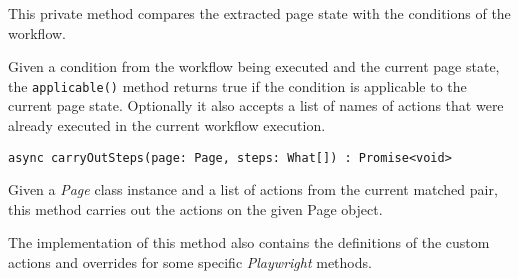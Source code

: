This private method compares the extracted page state with the conditions of the workflow.

Given a condition from the workflow being executed and the current page state, the \texttt{applicable()} method returns true if the condition is applicable to the current page state.
Optionally it also accepts a list of names of actions that were already executed in the current workflow execution.

\emptyline
\verb|async carryOutSteps(page: Page, steps: What[]) : Promise<void>|

\smallskip

Given a \textit{Page} class instance and a list of actions from the current matched pair, this method carries out the actions on the given Page object.

The implementation of this method also contains the definitions of the custom actions and overrides for some specific \textit{Playwright} methods.

